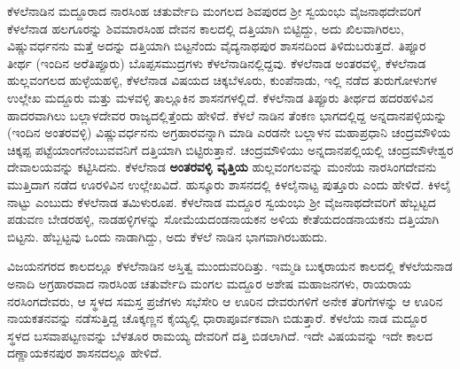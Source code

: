 ಕೆಳಲೆನಾಡಿನ ಮದ್ದೂರಾದ ನಾರಸಿಂಹ ಚತುರ್ವೇದಿ ಮಂಗಲದ ಶಿವಪುರದ ಶ‍್ರೀ ಸ್ವಯಂಭು ವೈಜನಾಥದೇವರಿಗೆ ಕೆಳಲೆನಾಡ ಹಲಗೂರನ್ನು ಶಿವಮಾರಸಿಂಹ ದೇವನ ಕಾಲದಲ್ಲಿ ದತ್ತಿಯಾಗಿ ಬಿಟ್ಟಿದ್ದು, ಅದು ಖಿಲವಾಗಿರಲು, ವಿಷ್ಣುವರ್ಧನನು ಮತ್ತೆ ಅದನ್ನು ದತ್ತಿಯಾಗಿ ಬಿಟ್ಟನೆಂದು ವೈದ್ಯನಾಥಪುರ ಶಾಸನದಿಂದ ತಿಳಿದುಬರುತ್ತದೆ. ತಿಪ್ಪೂರ ತೀರ್ಥ (ಇಂದಿನ ಅರೆತಿಪ್ಪೂರು) ಬೊಪ್ಪಸಮುದ್ರಗಳು ಕೆಳಲೆನಾಡಿನಲ್ಲಿದ್ದವು. ಕೆಳಲೆನಾಡ ಅಂತರವಳ್ಳಿ, ಕೆಳಲೆನಾಡ ಹುಲ್ಲವಂಗಲದ ಹುಳ್ಳೆಯಹಳ್ಳಿ, ಕೆಳಲೆನಾಡ ವಿಷಯದ ಚಿಕ್ಕಬೆಳೂರು, ಕುಂಪೆನಾಡು, ಇಲ್ಲಿ ನಡೆದ ತುರುಗೋಳುಗಳ ಉಲ್ಲೇಖ ಮದ್ದೂರು ಮತ್ತು ಮಳವಳ್ಳಿ ತಾಲ್ಲೂಕಿನ ಶಾಸನಗಳಲ್ಲಿದೆ. ಕೆಳಲೆನಾಡ ತಿಪ್ಪೂರು ತೀರ್ಥದ ಹದರಹಳಿವಿನ ಹಾದರವಾಗಿಲು ಬಲ್ಲಾಳದೇವರ ರಾಜ್ಯದಲ್ಲಿತ್ತೆಂದು ಹೇಳಿದೆ. ಕೆಳಲೆ ನಾಡಿನ ತೆಂಕಣ ಭಾಗದಲ್ಲಿದ್ದ ಅನ್ನದಾನಪಳ್ಳಿಯನ್ನು (ಇಂದಿನ ಅಂತರವಳ್ಳಿ) ವಿಷ್ಣುವರ್ಧನನು ಅಗ್ರಹಾರವನ್ನಾಗಿ ಮಾಡಿ ಎರಡನೇ ಬಲ್ಲಾಳನ ಮಹಾಪ್ರಧಾನಿ ಚಂದ್ರಮೌಳಿಯ ಚಿಕ್ಕಪ್ಪ ಪಟ್ಟೆಯಾಂಗನೆಂಬುವವನಿಗೆ ದತ್ತಿಯಾಗಿ ಬಿಟ್ಟಿರುತ್ತಾನೆ. ಚಂದ್ರಮೌಳಿಯು ಅನ್ನದಾನಪಲ್ಲಿಯಲ್ಲಿ ಚಂದ್ರಮೌಳೇಶ್ವರ ದೇವಾಲಯ\-ವನ್ನು ಕಟ್ಟಿಸಿದನು. ಕೆಳಲೆನಾಡ \textbf{ಅಂತರವಳ್ಳಿ ವೃತ್ತಿಯ} ಹುಲ್ಲವಂಗಲವನ್ನು ಮಂನೆಯ ನಾರಸಿಂಗದೇವನು ಮುತ್ತಿದಾಗ ನಡೆದ ಊರಳಿವಿನ ಉಲ್ಲೇಖವಿದೆ. ಹುಸ್ಕೂರು ಶಾಸನದಲ್ಲಿ ಕಿಳಲೈನಾಟ್ಟ ಪುತ್ತೂರು ಎಂದು ಹೇಳಿದೆ. ಕಿಳಲೈ ನಾಟ್ಟು ಎಂಬುದು ಕೆಳಲೆನಾಡ ತಮಿಳುರೂಪ. ಕೆಳಲೆನಾಡ ಮದ್ದೂರ ಸ್ವಯಂಭು ಶ‍್ರೀ ವೈಜನಾಥದೇವರಿಗೆ ಹೆಬ್ಬಟ್ಟದ ಪಡುವಣ ಬೇಡರಹಳ್ಳಿ, ನಾಡಹಳ್ಳಿಗಳನ್ನು ಸೋಮೆಯದಂಡನಾಯಕನ ಅಳಿಯ ಕೇತೆಯದಂಡನಾಯಕನು ದತ್ತಿಯಾಗಿ ಬಿಟ್ಟನು. ಹೆಬ್ಬಟ್ಟವು ಒಂದು ನಾಡಾಗಿದ್ದು, ಅದು ಕೆಳಲೆ ನಾಡಿನ ಭಾಗವಾಗಿರಬಹುದು.

ವಿಜಯನಗರದ ಕಾಲದಲ್ಲೂ ಕೆಳಲೆನಾಡಿನ ಅಸ್ತಿತ್ವ ಮುಂದುವರಿದಿತ್ತು. ಇಮ್ಮಡಿ ಬುಕ್ಕರಾಯನ ಕಾಲದಲ್ಲಿ ಕೆಳಲೆಯನಾಡ ಅನಾದಿ ಅಗ್ರಹಾರವಾದ ನಾರಸಿಂಹ ಚತುರ್ವೇದಿ ಮಂಗಲ ಮದ್ದೂರ ಅಶೇಷ ಮಹಾಜನಗಳು, ರಾಯರಾಯ ನರಸಿಂಗದೇವರು, ಆ ಸ್ಥಳದ ಸಮಸ್ತ ಪ್ರಜೆಗಳು ಸಭೆಸೇರಿ ಆ ಊರಿನ ದೇವರುಗಳಿಗೆ ಅನೇಕ ತೆರಿಗೆಗಳನ್ನು ಆ ಊರಿನ ನಾಯಕತನವನ್ನು ನಡೆಸುತ್ತಿದ್ದ ಚೊಕ್ಕಣ್ಣನ ಕೈಯ್ಯಲ್ಲಿ ಧಾರಾಪೂರ್ವಕವಾಗಿ ಬಿಡುತ್ತಾರೆ. ಕೆಳಲೆಯ ನಾಡ ಮದ್ದೂರ ಸ್ಥಳದ ಬಸವಾಪಟ್ಟಣವನ್ನು ಬೆಳತೂರ ರಾಮಯ್ಯ ದೇವರಿಗೆ ದತ್ತಿ ಬಿಡಲಾಗಿದೆ. ಇದೇ ವಿಷಯವನ್ನು ಇದೇ ಕಾಲದ ದಣ್ಣಾಯಕನಪುರ ಶಾಸನದಲ್ಲೂ ಹೇಳಿದೆ.

